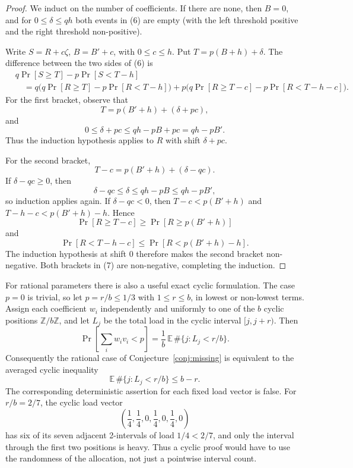 \documentclass[12pt]{article}
\begin{document}
\begin{proof}
We induct on the number of coefficients.  If there are none, then
\(B=0\), and for \(0\le\delta\le qh\) both events in (6) are empty (with the
left threshold positive and the right threshold non-positive).

Write \(S=R+c\zeta\), \(B=B'+c\), with \(0\le c\le h\).  Put
\(T=p(B+h)+\delta\).  The difference between the two sides of (6) is
\begin{equation}
\begin{aligned}
& q\Pr[S\ge T]-p\Pr[S<T-h]                                      \\
&\quad =
q\Big(q\Pr[R\ge T]-p\Pr[R<T-h]\Big)
+p\Big(q\Pr[R\ge T-c]-p\Pr[R<T-h-c]\Big).
\end{aligned}                                                   \tag{7}
\end{equation}
For the first bracket, observe that
\[
        T=p(B'+h)+(\delta+pc),
\]
and
\[
        0\le\delta+pc\le qh-pB+pc=qh-pB'.
\]
Thus the induction hypothesis applies to \(R\) with shift \(\delta+pc\).

For the second bracket,
\[
        T-c=p(B'+h)+(\delta-qc).
\]
If \(\delta-qc\ge0\), then
\[
        \delta-qc\le\delta\le qh-pB\le qh-pB',
\]
so induction applies again.  If \(\delta-qc<0\), then
\(T-c<p(B'+h)\) and \(T-h-c<p(B'+h)-h\).  Hence
\[
 \Pr[R\ge T-c]\ge \Pr[R\ge p(B'+h)]
\]
and
\[
 \Pr[R<T-h-c]\le \Pr[R<p(B'+h)-h].
\]
The induction hypothesis at shift \(0\) therefore makes the second bracket
non-negative.  Both brackets in (7) are non-negative, completing the induction.
\end{proof}

For rational parameters there is also a useful exact cyclic formulation.  The
case \(p=0\) is trivial, so let \(p=r/b\le1/3\) with \(1\le r\le b\), in
lowest or non-lowest terms.  Assign each coefficient \(w_i\)
independently and uniformly to one of the \(b\) cyclic positions
\(\mathbb Z/b\mathbb Z\), and let \(L_j\) be the total load in the cyclic
interval \([j,j+r)\).  Then
\[
        \Pr\!\left[\sum_i w_i v_i<p\right]
        =\frac1b\,\mathbb E\,\#\{j:L_j<r/b\}.              \tag{8}
\]
Consequently the rational case of Conjecture~\ref{conj:missing} is equivalent
to the averaged cyclic inequality
\[
        \mathbb E\,\#\{j:L_j<r/b\}\le b-r .                \tag{9}
\]
The corresponding deterministic assertion for each fixed load vector is false.
For \(r/b=2/7\), the cyclic load vector
\[
   \left(\frac14,\frac14,0,\frac14,0,\frac14,0\right)
\]
has six of its seven adjacent 2-intervals of load \(1/4<2/7\), and only the
interval through the first two positions is heavy.  Thus a cyclic proof would
have to use the randomness of the allocation, not just a pointwise interval
count.
\end{document}
